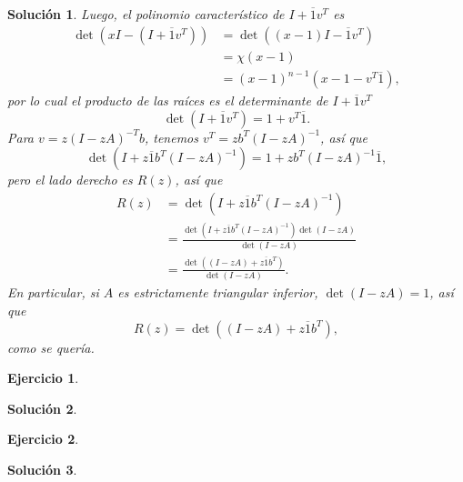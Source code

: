 \documentclass[11pt]{article}
\newtheorem{exercise}{Ejercicio}
\newtheorem*{sol}{Solución}
\newcommand\ol\overline
\begin{document}
\begin{sol}
  Luego, el polinomio característico de $I+\ol 1 v^{T}$ es
  \begin{align}
    \det(xI-(I+\ol 1v^{T}))
    &= \det((x-1)I-\ol 1v^{T}) \\
    &= \chi(x-1) \\
    &= (x-1)^{n-1}(x-1-v^{T}\ol 1)
  ,\end{align}
  por lo cual el producto de las raíces es el determinante de $I+\ol
  1v^{T}$
  \begin{equation}
    \det(I+\ol 1v^{T}) = 1+v^{T}\ol 1
  .\end{equation}
  Para $v=z(I-zA)^{-T}b$, tenemos $v^{T}=zb^{T}(I-zA)^{-1}$, así que
  \begin{equation}
    \det(I+z\ol 1b^{T}(I-zA)^{-1}) = 1+zb^{T}(I-zA)^{-1}\ol 1
  ,\end{equation}
  pero el lado derecho es $R(z)$, así que
  \begin{align}
    R(z)
    &= \det(I+z\ol 1b^{T}(I-zA)^{-1}) \\
    &= \frac{ \det(I+z\ol 1b^{T}(I-zA)^{-1})\det(I-zA)}{\det(I-zA)} \\
    &= \frac{ \det((I-zA)+z\ol 1b^{T})}{\det(I-zA)}
  .\end{align}
  En particular, si $A$ es estrictamente triangular inferior,
  $\det(I-zA)=1$, así que
  \begin{equation}
    R(z) = \det((I-zA)+z\ol 1b^{T})
  ,\end{equation}
  como se quería.
\end{sol}

\begin{exercise}
\end{exercise}
\begin{sol}
\end{sol}

\begin{exercise}
\end{exercise}
\begin{sol}
\end{sol}
\end{document}
